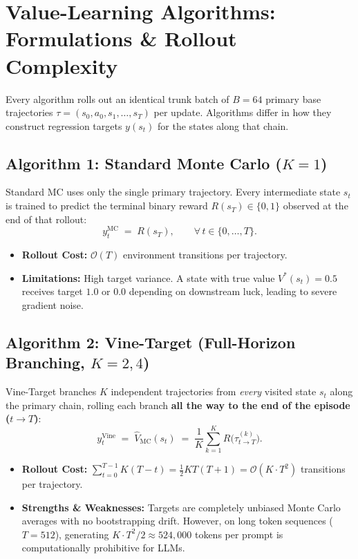 \documentclass[11pt,a4paper]{article}
\begin{document}
\bigskip

\section{Value-Learning Algorithms: Formulations \& Rollout Complexity}

Every algorithm rolls out an identical trunk batch of $B = 64$ primary base trajectories $\tau = (s_0, a_0, s_1, \dots, s_T)$ per update. Algorithms differ in how they construct regression targets $y(s_t)$ for the states along that chain.

\subsection{Algorithm 1: Standard Monte Carlo ($K=1$)}
Standard MC uses only the single primary trajectory. Every intermediate state $s_t$ is trained to predict the terminal binary reward $R(s_T) \in \{0, 1\}$ observed at the end of that rollout:
\[
    y_t^{\text{MC}} \;=\; R(s_T), \qquad \forall\, t \in \{0, \dots, T\}.
\]
\begin{itemize}[leftmargin=*, itemsep=1.5pt]
    \item \textbf{Rollout Cost:} $\mathcal{O}(T)$ environment transitions per trajectory.
    \item \textbf{Limitations:} High target variance. A state with true value $V^*(s_t) = 0.5$ receives target $1.0$ or $0.0$ depending on downstream luck, leading to severe gradient noise.
\end{itemize}

\subsection{Algorithm 2: Vine-Target (Full-Horizon Branching, $K=2, 4$)}
Vine-Target branches $K$ independent trajectories from \emph{every} visited state $s_t$ along the primary chain, rolling each branch \textbf{all the way to the end of the episode ($t \to T$)}:
\[
    y_t^{\text{Vine}} \;=\; \hat{V}_{\text{MC}}(s_t) \;=\; \frac{1}{K}\sum_{k=1}^K R\big(\tau_{t \to T}^{(k)}\big).
\]
\begin{itemize}[leftmargin=*, itemsep=1.5pt]
    \item \textbf{Rollout Cost:} $\sum_{t=0}^{T-1} K(T-t) = \frac{1}{2} K T (T+1) = \mathcal{O}(K \cdot T^2)$ transitions per trajectory.
    \item \textbf{Strengths \& Weaknesses:} Targets are completely unbiased Monte Carlo averages with no bootstrapping drift. However, on long token sequences ($T=512$), generating $K \cdot T^2 / 2 \approx 524,000$ tokens per prompt is computationally prohibitive for LLMs.
\end{itemize}
\end{document}
